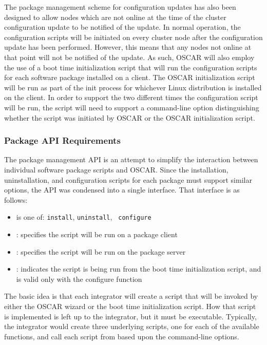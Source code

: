 The package management scheme for configuration updates has also been
designed to allow nodes which are not online at the time of the
cluster configuration update to be notified of the update. In normal
operation, the configuration scripts will be initiated on every
cluster node after the configuration update has been
performed. However, this means that any nodes not online at that point
will not be notified of the update. As such, OSCAR will also employ
the use of a boot time initialization script that will run the
configuration scripts for each software package installed on a
client. The OSCAR initialization script will be run as part of the
init process for whichever Linux distribution is installed on the
client. In order to support the two different times the configuration
script will be run, the script will need to support a command-line
option distinguishing whether the script was initiated by OSCAR or the
OSCAR initialization script.

\subsubsection{Package API Requirements}

The package management API is an attempt to simplify the interaction
between individual software package scripts and OSCAR.  Since the
installation, uninstallation, and configuration scripts for each
package must support similar options, the API was condensed into a
single interface. That interface is as follows:


\begin{itemize}
\item {} is one of: {\tt install}, {\tt uninstall}, {\tt
    configure}

\item {}: specifies the script will be run on a package client
  
\item {}: specifies the script will be run on the package server
  
\item {}: indicates the script is being run from the boot
  time initialization script, and is valid only with the configure
  function
\end{itemize}

The basic idea is that each integrator will create a
 script that will be invoked by either the OSCAR
wizard or the boot time initialization script. How that script is
implemented is left up to the integrator, but it must be executable. 
Typically, the integrator would create three underlying scripts, one 
for each of the available functions, and call each script from 
 based upon the command-line options.

